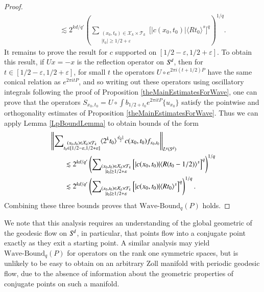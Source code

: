 \begin{proof}
\begin{equation}
\begin{split}
        &\quad\quad \lesssim 2^{kd/q'} \left( \sum\nolimits_{\substack{(x_0,t_0) \in \mathcal{X}_k \times \mathcal{T}_k\\|t_0| \geq 1/2 + \varepsilon}} \Big[ |c(x_0,t_0)| \langle R t_0 \rangle^{s} \Big]^q \right)^{1/q}.
    \end{split}
    \end{equation}
    It remains to prove the result for $c$ supported on $[1/2 - \varepsilon, 1/2 + \varepsilon]$. To obtain this result, if $Ux = -x$ is the reflection operator on ${S}^{\!{d}}$, then for $t \in [1/2 - \varepsilon, 1/2 + \varepsilon]$, for small $t$ the operators $U \circ e^{2 \pi i (t + 1/2) P}$ have the same conical relation as $e^{2 \pi i t P}$, and so writing out these operators using oscillatory integrals following the proof of Proposition \ref{theMainEstimatesForWave}, one can prove that the operators $S\!_{x_0,t_0} = U \circ \int b_{1/2 + t_0} e^{2 \pi i t P} \{ u_{x_0} \}$ satisfy the pointwise and orthogonality estimates of Proposition \ref{theMainEstimatesForWave}. Thus we can apply Lemma \ref{LpBoundLemma} to obtain bounds of the form
    \begin{equation}
    \begin{split}
        &\left\| \sum\nolimits_{\substack{(x_0,t_0) \in \mathcal{X}_k \times \mathcal{T}_k\\t_0 \in [1/2 - \varepsilon, 1/2 + \varepsilon]}} \langle 2^k t_0 \rangle^{\frac{d-1}{2}} c(x_0,t_0) f_{x_0,t_0} \right\|_{L^q({S}^{\!{d}})} \\
        &\quad\quad \lesssim 2^{kd/q'} \left( \sum\nolimits_{\substack{(x_0,t_0) \in \mathcal{X}_k \times \mathcal{T}_k\\|t_0| \geq 1/2 + \varepsilon}} \Big[ |c(x_0,t_0)| \langle R (t_0 - 1/2) \rangle^{s} \Big]^q \right)^{1/q}\\
        &\quad\quad \lesssim 2^{kd/q'} \left( \sum\nolimits_{\substack{(x_0,t_0) \in \mathcal{X}_k \times \mathcal{T}_k\\|t_0| \geq 1/2 + \varepsilon}} \Big[ |c(x_0,t_0)| \langle R t_0 \rangle^{s} \Big]^q \right)^{1/q}.
    \end{split}
    \end{equation}
    Combining these three bounds proves that $\text{Wave-Bound}_q(P)$ holds.
\end{proof}

\begin{remark}
    We note that this analysis requires an understanding of the global geometric of the geodesic flow on ${S}^{\!{d}}$, in particular, that points flow into a conjugate point exactly as they exit a starting point. A similar analysis may yield $\text{Wave-Bound}_q(P)$ for operators on the rank one symmetric spaces, but is unlikely to be easy to obtain on an arbitrary Zoll manifold with periodic geodesic flow, due to the absence of information about the geometric properties of conjugate points on such a manifold.
\end{remark}

